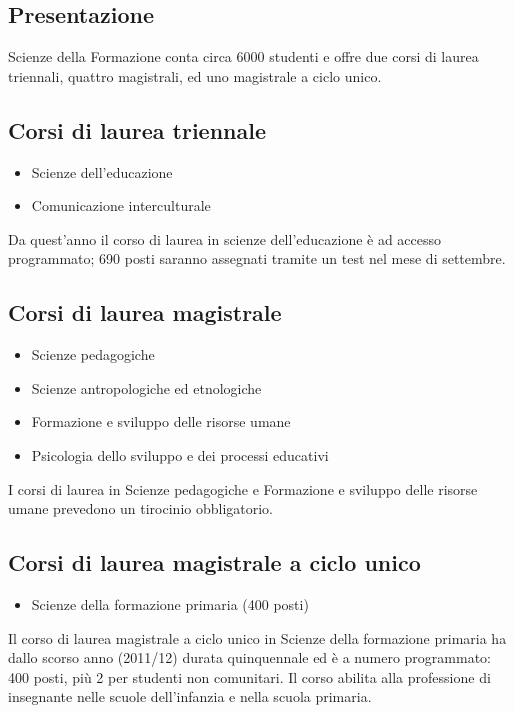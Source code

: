 \subsection{Presentazione}
Scienze della Formazione conta circa 6000 studenti e offre due corsi di laurea triennali, quattro magistrali, ed uno magistrale a ciclo unico. 

\subsection{Corsi di laurea triennale}
\begin{itemize}
\item Scienze dell'educazione 
\item Comunicazione interculturale
\end{itemize}
Da quest'anno il corso di laurea in scienze dell'educazione è ad accesso programmato; 690 posti saranno assegnati tramite un test nel mese di settembre. 

\subsection{Corsi di laurea magistrale}
\begin{itemize}
\item Scienze pedagogiche 
\item Scienze antropologiche ed etnologiche 
\item Formazione e sviluppo delle risorse umane 
\item Psicologia dello sviluppo e dei processi educativi 
\end{itemize}
I corsi di laurea  in Scienze pedagogiche e Formazione e sviluppo delle risorse umane prevedono un tirocinio obbligatorio. 

\subsection{Corsi di laurea magistrale a ciclo unico}
\begin{itemize}
\item Scienze della formazione primaria (400 posti) 
\end{itemize}
Il corso di laurea magistrale a ciclo unico in Scienze della formazione primaria ha dallo scorso anno (2011/12) durata quinquennale ed è a numero programmato: 400 posti, più 2 per studenti non comunitari. Il corso abilita alla professione di insegnante nelle scuole dell'infanzia e nella scuola primaria. 

